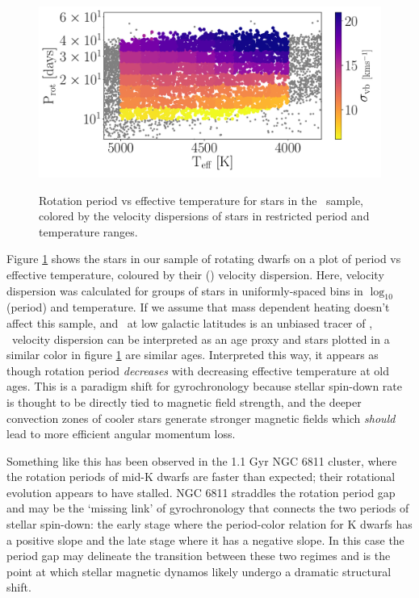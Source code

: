\begin{figure}
  \caption{
Rotation period vs effective temperature for stars in the \mct\ sample,
    colored by the velocity dispersions of stars in restricted period and
    temperature ranges.
}
  \centering
    \includegraphics[width=1\textwidth]{dispersion_period_teff}
\label{fig:dispersion_period_teff}
\end{figure}
Figure \ref{fig:dispersion_period_teff} shows the stars in our sample of
rotating dwarfs on a
plot of period vs effective temperature, coloured by their (\vb) velocity
dispersion.
Here, velocity dispersion was calculated for groups of stars in
uniformly-spaced bins in $\log_{10}$(period) and temperature.
If we assume that mass dependent heating doesn't affect this sample, and \vb\
at low galactic latitudes is an unbiased tracer of \vz, \vb\ velocity
dispersion can be interpreted as an age proxy and stars plotted in a similar
color in figure \ref{fig:dispersion_period_teff} are similar ages.
Interpreted this way, it appears as though rotation period {\it decreases}
with decreasing effective temperature at old ages.  This is a paradigm shift
for gyrochronology because stellar spin-down rate is thought to be directly
tied to magnetic field strength, and the deeper convection zones of cooler
stars generate stronger magnetic fields which {\it should} lead to more
efficient angular momentum loss.

Something like this has been observed in the 1.1 Gyr NGC 6811 cluster, where
the rotation periods of mid-K dwarfs are faster than expected; their
rotational evolution appears to have stalled.
NGC 6811 straddles the rotation period gap and may be the `missing link' of
gyrochronology that connects the two periods of stellar spin-down: the early
stage where the period-color relation for K dwarfs has a positive slope and
the late stage where it has a negative slope.
In this case the period gap may delineate the transition between these two
regimes and is the point at which stellar magnetic dynamos likely undergo a
dramatic structural shift.

